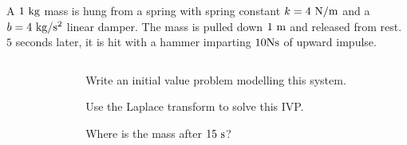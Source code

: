 \begin{applicationActivities}
\begin{activity}{15}
A \(1\ {\rm kg}\) mass is hung from a spring with spring constant \(k=4\ {\rm N/m}\) and a \(b=4\ {\rm kg/s^2}\) linear damper.  The mass is pulled down \(1{\ \rm m}\) and released from rest.  \(5\) seconds later, it is hit with a hammer imparting \(10 {\rm N s}\) of upward impulse.
\vfill
\begin{columns}
\begin{column}{0.3\textwidth}
\begin{center}
\springmassdamper
\end{center}
\end{column}
\begin{column}{0.7\textwidth}
\begin{subactivity}
Write an initial value problem modelling this system.
\end{subactivity}
\begin{subactivity}
Use the Laplace transform to solve this IVP.
\end{subactivity}
\begin{subactivity}
Where is the mass after \(15{\ \rm s}\)?
\end{subactivity}
\end{column}
\end{columns}
\end{activity}



\end{applicationActivities}
